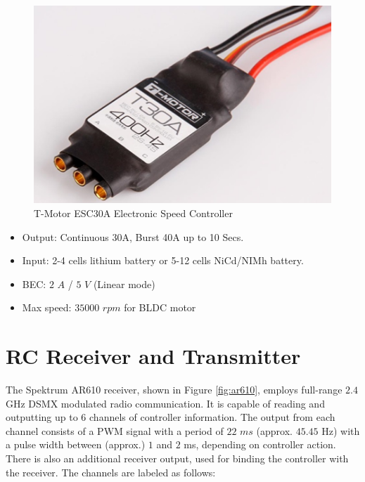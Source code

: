 \documentclass[a4paper]{report}
\begin{document}
\begin{figure}[h]
    \centering
    \includegraphics[scale=0.8]{images/esc_tmotor.png}
    \caption{T-Motor ESC30A Electronic Speed Controller}
    \label{fig:esc_tmotor}
\end{figure}

\begin{itemize}
  \item Output: Continuous 30A, Burst 40A up to 10 Secs.
  \item Input: 2-4 cells lithium battery or 5-12 cells NiCd/NIMh battery.  
  \item BEC: $2$ $A$ / $5$ $V$ (Linear mode)
  \item Max speed: $35000$ $rpm$ for BLDC motor
\end{itemize}

	\section{RC Receiver and Transmitter}

The Spektrum AR610 receiver, shown in Figure \ref{fig:ar610}, employs full-range $2.4$ GHz DSMX modulated radio communication. It is capable of reading and outputting up to 6 channels of controller information. The output from each channel consists of a PWM signal with a period of $22$ $ms$ (approx. $45.45$ Hz) with a pulse width between (approx.) $1$ and $2$ ms, depending on controller action. There is also an additional receiver output, used for binding the controller with the receiver. The channels are labeled as follows:
\end{document}
